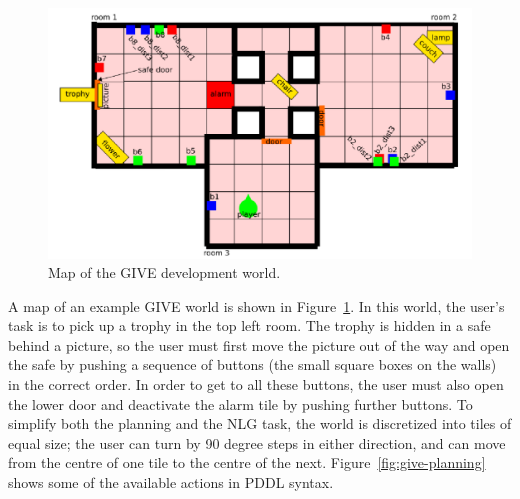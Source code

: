 \begin{figure}
\centering
\includegraphics[width=1 \columnwidth]{give_world_2}
\caption{Map of the GIVE development world.}
  \label{fig:give-development-world}
\end{figure}

A map of an example GIVE world is shown in
Figure~\ref{fig:give-development-world}.  In this world, the user's task is
to pick up a trophy in the top left room.  The trophy is hidden in a safe
behind a picture, so the user must first move the picture out of the way
and open the safe by pushing a sequence of buttons (the small square boxes
on the walls) in the correct order.  In order to get to all these buttons,
the user must also open the lower door and deactivate the alarm tile by
pushing further buttons.  To simplify both the planning and the NLG task,
the world is discretized into tiles of equal size; the user can turn by 90
degree steps in either direction, and can move from the centre of one tile
to the centre of the next. Figure~\ref{fig:give-planning} shows some of the
available actions in PDDL syntax.

